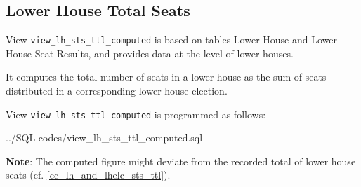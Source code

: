 \subsection{Lower House Total Seats}\label{view_lh_sts_ttl_computed}
View \texttt{\footnotesize view\_lh\_sts\_ttl\_computed} is based on tables  Lower House and Lower House Seat Results, and provides data at the level of lower houses.


It computes the total number of seats in a lower house as the sum of seats distributed in a corresponding lower house election.

View \texttt{\footnotesize view\_lh\_sts\_ttl\_computed} is programmed as follows:

%
{../SQL-codes/view_lh_sts_ttl_computed.sql}

{\bf Note}: The computed figure might deviate from the recorded total of lower house seats (cf. \ref{cc_lh_and_lhelc_sts_ttl}).